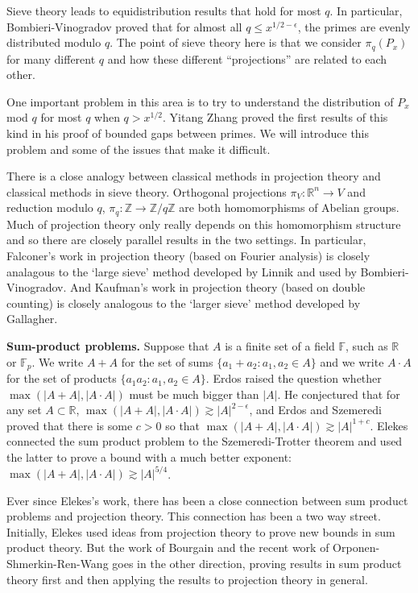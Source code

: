 \documentclass[12pt]{amsart}
\newcommand{\FF}{\mathbb{F}}
\newcommand{\ZZ}{\mathbb{Z}}
\newcommand{\RR}{\mathbb{R}}
\begin{document}
Sieve theory leads to equidistribution results that hold for most $q$.   In particular,  Bombieri-Vinogradov proved that for almost all $q \le x^{1/2 - \epsilon}$,  the primes are evenly distributed modulo $q$.   The point of sieve theory here is that we consider $\pi_q(P_x)$ for many different $q$ and how these different ``projections'' are related to each other.


One important problem in this area is to try to understand the distribution of $P_x$ mod $q$ for most $q$ when $q > x^{1/2}$.   Yitang Zhang proved the first results of this kind in his proof of bounded gaps between primes.   We will introduce this problem and some of the issues that make it difficult. 

There is a close analogy between classical methods in projection theory and classical methods in sieve theory.   Orthogonal projections $\pi_V: \RR^n \rightarrow V$ and reduction modulo $q$,  $\pi_q: \ZZ \rightarrow \ZZ / q \ZZ$ are both homomorphisms of Abelian groups.  Much of projection theory only really depends on this homomorphism structure and so there are closely parallel results in the two settings.   In particular,  Falconer's work in projection theory (based on Fourier analysis) is closely analagous to the `large sieve' method developed by Linnik and used by Bombieri-Vinogradov.  And Kaufman's work in projection theory (based on double counting) is closely analogous to the `larger sieve' method developed by Gallagher.


\vskip10pt

{\bf Sum-product problems.} Suppose that $A$ is a finite set of a field $\FF$,  such as $\RR$ or $\FF_p$.   We write $A + A$ for the set of sums $\{a_1 + a_2: a_1, a_2 \in A \}$ and we write $A \cdot A$ for the set of products $\{ a_1 a_2 : a_1, a_2 \in A \}$.   Erdos raised the question whether $\max ( |A + A |,  |A \cdot A|)$ must be much bigger than $|A|$.   He conjectured that for any set $A \subset \RR$,  $\max( |A+A|,  |A \cdot A|) \gtrsim |A|^{2 - \epsilon}$,  and Erdos and Szemeredi proved that there is some $c > 0$ so that $\max( |A+A|,  |A \cdot A|) \gtrsim |A|^{1+c}$.   Elekes connected the sum product problem to the Szemeredi-Trotter theorem and used the latter to prove a bound with a much better exponent: $\max( |A+A|,  |A \cdot A|) \gtrsim |A|^{5/4}$.  

Ever since Elekes's work,  there has been a close connection between sum product problems and projection theory.   This connection has been a two way street.   Initially,  Elekes used ideas from projection theory to prove new bounds in sum product theory.   But the work of Bourgain and the recent work of Orponen-Shmerkin-Ren-Wang goes in the other direction,  proving results in sum product theory first and then applying the results to projection theory in general.
\end{document}
